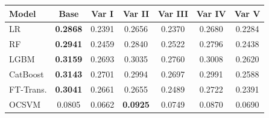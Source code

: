 \begin{tabular}{l c c c c c c}
\toprule
Model & Base & Var I & Var II & Var III & Var IV & Var V \\
\midrule
LR         & \textbf{0.2868} & 0.2391 & 0.2656 & 0.2370 & 0.2680 & 0.2284 \\
RF         & \textbf{0.2941} & 0.2459 & 0.2840 & 0.2522 & 0.2796 & 0.2438 \\
LGBM       & \textbf{0.3159} & 0.2693 & 0.3035 & 0.2760 & 0.3008 & 0.2620 \\
CatBoost   & \textbf{0.3143} & 0.2701 & 0.2994 & 0.2697 & 0.2991 & 0.2588 \\
FT-Trans.  & \textbf{0.3041} & 0.2661 & 0.2655 & 0.2489 & 0.2722 & 0.2391 \\
OCSVM      & 0.0805 & 0.0662 & \textbf{0.0925} & 0.0749 & 0.0870 & 0.0690 \\
\bottomrule
\end{tabular}
